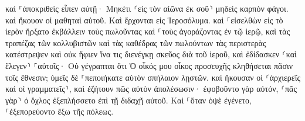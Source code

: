 \documentclass{openreader}
\begin{document}
καὶ ⸀ἀποκριθεὶς εἶπεν αὐτῇ· Μηκέτι ⸂εἰς τὸν αἰῶνα ἐκ σοῦ⸃ μηδεὶς καρπὸν φάγοι. καὶ ἤκουον οἱ μαθηταὶ αὐτοῦ. 
Καὶ ἔρχονται εἰς Ἱεροσόλυμα. καὶ ⸀εἰσελθὼν εἰς τὸ ἱερὸν ἤρξατο ἐκβάλλειν τοὺς πωλοῦντας καὶ ⸀τοὺς ἀγοράζοντας ἐν τῷ ἱερῷ, καὶ τὰς τραπέζας τῶν κολλυβιστῶν καὶ τὰς καθέδρας τῶν πωλούντων τὰς περιστερὰς κατέστρεψεν 
καὶ οὐκ ἤφιεν ἵνα τις διενέγκῃ σκεῦος διὰ τοῦ ἱεροῦ, 
καὶ ἐδίδασκεν ⸂καὶ ἔλεγεν⸃ ⸀αὐτοῖς· Οὐ γέγραπται ὅτι Ὁ οἶκός μου οἶκος προσευχῆς κληθήσεται πᾶσιν τοῖς ἔθνεσιν; ὑμεῖς δὲ ⸀πεποιήκατε αὐτὸν σπήλαιον λῃστῶν. 
καὶ ἤκουσαν οἱ ⸂ἀρχιερεῖς καὶ οἱ γραμματεῖς⸃, καὶ ἐζήτουν πῶς αὐτὸν ἀπολέσωσιν· ἐφοβοῦντο γὰρ αὐτόν, ⸂πᾶς γὰρ⸃ ὁ ὄχλος ἐξεπλήσσετο ἐπὶ τῇ διδαχῇ αὐτοῦ. 
Καὶ ⸀ὅταν ὀψὲ ἐγένετο, ⸀ἐξεπορεύοντο ἔξω τῆς πόλεως. 
\end{document}
